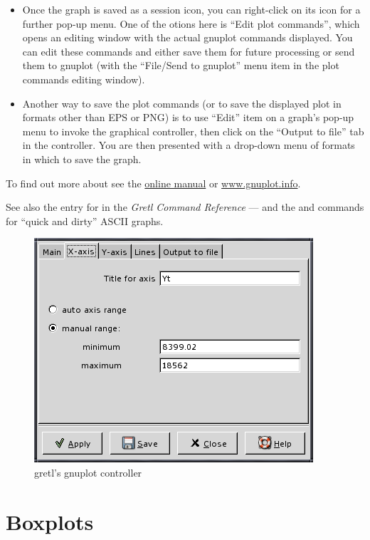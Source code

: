 \begin{itemize}
\item Once the graph is saved as a session icon, you can right-click
  on its icon for a further pop-up menu.  One of the otions here is
  ``Edit plot commands'', which opens an editing window with the
  actual gnuplot commands displayed. You can edit these commands and
  either save them for future processing or send them to gnuplot (with
  the ``File/Send to gnuplot'' menu item in the plot commands editing
  window).
\item Another way to save the plot commands (or to save the displayed
  plot in formats other than EPS or PNG) is to use ``Edit'' item on a
  graph's pop-up menu to invoke the graphical controller, then click
  on the ``Output to file'' tab in the controller.  You are then
  presented with a drop-down menu of formats in which to save the
  graph.
\end{itemize}

To find out more about  see the
\href{http://ricardo.ecn.wfu.edu/gnuplot.html}{online manual} or
\href{http://www.gnuplot.info/}{www.gnuplot.info}.

See also the entry for  in the \emph{Gretl Command
  Reference} --- and the  and  commands for
``quick and dirty'' ASCII graphs.

\begin{figure}[htbp]
  \caption{gretl's gnuplot controller}
  \label{fig-plot}
  \begin{center}
    \includegraphics[scale=0.5]{figures/plot_control}
  \end{center}
\end{figure}


\section{Boxplots}
\label{sect-boxplots}

